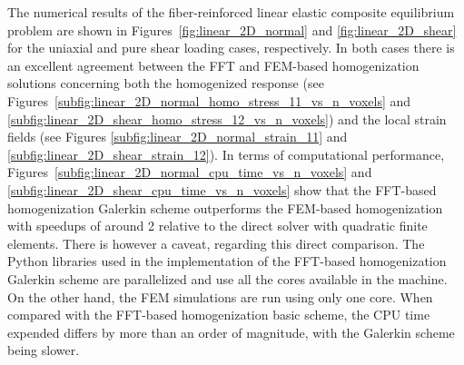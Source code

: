 The numerical results of the fiber-reinforced linear elastic composite equilibrium problem are shown in Figures~\ref{fig:linear_2D_normal} and \ref{fig:linear_2D_shear} for the uniaxial and pure shear loading cases, respectively.
In both cases there is an excellent agreement between the FFT and FEM-based homogenization solutions concerning both the homogenized response (see Figures~\ref{subfig:linear_2D_normal_homo_stress_11_vs_n_voxels} and \ref{subfig:linear_2D_shear_homo_stress_12_vs_n_voxels}) and the local strain fields (see Figures \ref{subfig:linear_2D_normal_strain_11} and \ref{subfig:linear_2D_shear_strain_12}).
In terms of computational performance, Figures~\ref{subfig:linear_2D_normal_cpu_time_vs_n_voxels} and \ref{subfig:linear_2D_shear_cpu_time_vs_n_voxels} show that the FFT-based homogenization Galerkin scheme outperforms the FEM-based homogenization with speedups of around 2 relative to the direct solver with quadratic finite elements.
There is however a caveat, regarding this direct comparison.
The Python libraries used in the implementation of the FFT-based homogenization Galerkin scheme are parallelized and use all the cores available in the machine.
On the other hand, the FEM simulations are run using only one core.
When compared with the FFT-based homogenization basic scheme, the CPU time expended differs by more than an order of magnitude, with the Galerkin scheme being slower.

